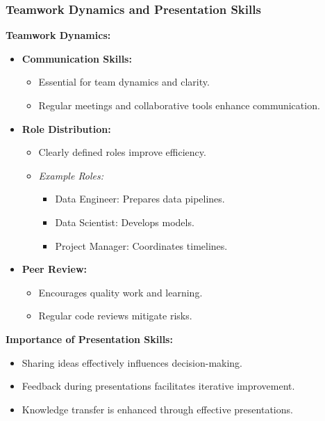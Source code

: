 \documentclass[aspectratio=169]{beamer}
\begin{document}
\begin{frame}[fragile]
    \frametitle{Teamwork Dynamics and Presentation Skills}
    \textbf{Teamwork Dynamics:}
    \begin{itemize}
        \item \textbf{Communication Skills:} 
        \begin{itemize}
            \item Essential for team dynamics and clarity.
            \item Regular meetings and collaborative tools enhance communication.
        \end{itemize}
        
        \item \textbf{Role Distribution:} 
        \begin{itemize}
            \item Clearly defined roles improve efficiency.
            \item \textit{Example Roles:}
            \begin{itemize}
                \item Data Engineer: Prepares data pipelines.
                \item Data Scientist: Develops models.
                \item Project Manager: Coordinates timelines.
            \end{itemize}
        \end{itemize}

        \item \textbf{Peer Review:} 
        \begin{itemize}
            \item Encourages quality work and learning.
            \item Regular code reviews mitigate risks.
        \end{itemize}
    \end{itemize}
    
    \textbf{Importance of Presentation Skills:}
    \begin{itemize}
        \item Sharing ideas effectively influences decision-making.
        \item Feedback during presentations facilitates iterative improvement.
        \item Knowledge transfer is enhanced through effective presentations.
    \end{itemize}
\end{frame}
\end{document}
